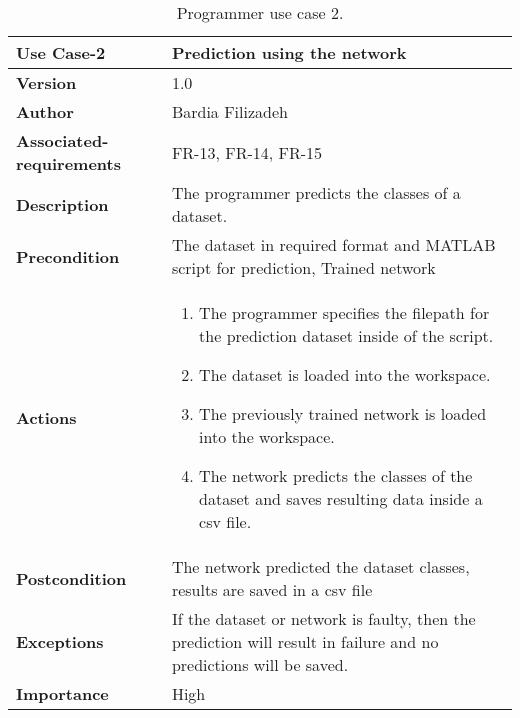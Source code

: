 \begin{table}[p]
	\centering
	\begin{tabularx}{\linewidth}{ p{} p{} }
		\toprule
		\textbf{Use Case-2}    & \textbf{Prediction using the network}\\
		\toprule
		\textbf{Version}              & 1.0    \\
		\textbf{Author}                & Bardia Filizadeh \\
		\textbf{Associated-requirements} & FR-13, FR-14, FR-15\\
		\textbf{Description}          & The programmer predicts the classes of a dataset. \\
		\textbf{Precondition}         & The dataset in required format and MATLAB script for prediction, Trained network \\
		\textbf{Actions}             &
		\begin{enumerate}
			\def\labelenumi{\arabic{enumi}.}
			\tightlist
			\item The programmer specifies the filepath for the prediction dataset inside of the script.
			\item The dataset is loaded into the workspace.
            \item The previously trained network is loaded into the workspace.
            \item The network predicts the classes of the dataset and saves resulting data inside a csv file.
		\end{enumerate}\\
		\textbf{Postcondition}        & The network predicted the dataset classes, results are saved in a csv file \\
		\textbf{Exceptions}          & If the dataset or network is faulty, then the prediction will result in failure and no predictions will be saved. \\
		\textbf{Importance}          & High \\
		\bottomrule
	\end{tabularx}
	\caption{Programmer use case 2.}\label{table2}
\end{table}


